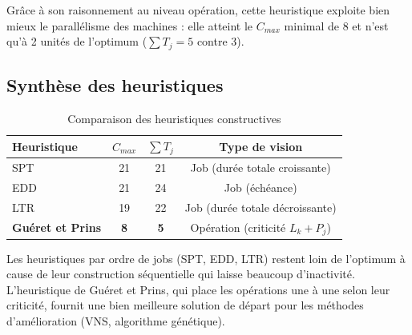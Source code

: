 Grâce à son raisonnement au niveau opération, cette heuristique exploite bien mieux le parallélisme des machines : elle atteint le $C_{max}$ minimal de 8 et n'est qu'à 2 unités de l'optimum ($\sum T_j = 5$ contre 3).

\subsection{Synthèse des heuristiques}

\begin{table}[H]
\centering
\begin{tabular}{lccc}
\toprule
\textbf{Heuristique} & \textbf{$C_{max}$} & \textbf{$\sum T_j$} & \textbf{Type de vision} \\
\midrule
SPT            & 21 & 21 & Job (durée totale croissante) \\
EDD            & 21 & 24 & Job (échéance) \\
LTR            & 19 & 22 & Job (durée totale décroissante) \\
\textbf{Guéret et Prins} & \textbf{8} & \textbf{5} & Opération (criticité $L_k + P_j$) \\
\bottomrule
\end{tabular}
\caption{Comparaison des heuristiques constructives}
\end{table}

Les heuristiques par ordre de jobs (SPT, EDD, LTR) restent loin de l'optimum à cause de leur construction séquentielle qui laisse beaucoup d'inactivité. L'heuristique de Guéret et Prins, qui place les opérations une à une selon leur criticité, fournit une bien meilleure solution de départ pour les méthodes d'amélioration (VNS, algorithme génétique).
